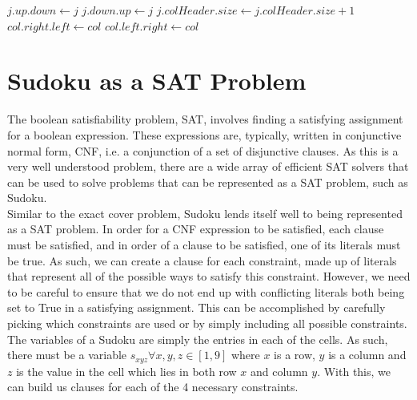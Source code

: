 \documentclass[12pt]{article}
\newcounter{row}
\newcounter{col}
\begin{document}
\begin{algorithm}[!ht]
\label{uncover}
\begin{algorithmic}
\State $j.up.down \gets j$
\State $j.down.up \gets j$
\State $j.colHeader.size \gets j.colHeader.size + 1$
\EndFor
\EndFor
\State $col.right.left \gets col$
\State $col.left.right \gets col$
\EndProcedure
\end{algorithmic}
\end{algorithm}

\section{Sudoku as a SAT Problem}
The boolean satisfiability problem, SAT, involves finding a satisfying assignment for a boolean expression. These expressions are, typically, written in conjunctive normal form, CNF, i.e. a conjunction of a set of disjunctive clauses. As this is a very well understood problem, there are a wide array of efficient SAT solvers that can be used to solve problems that can be represented as a SAT problem, such as Sudoku. \\

Similar to the exact cover problem, Sudoku lends itself well to being represented as a SAT problem. In order for a CNF expression to be satisfied, each clause must be satisfied, and in order of a clause to be satisfied, one of its literals must be true. As such, we can create a clause for each constraint, made up of literals that represent all of the possible ways to satisfy this constraint. However, we need to be careful to ensure that we do not end up with conflicting literals both being set to True in a satisfying assignment. This can be accomplished by carefully picking which constraints are used or by simply including all possible constraints. \\

The variables of a Sudoku are simply the entries in each of the cells. As such, there must be a variable $s_{xyz} \forall x,y,z \in [1,9]$ where $x$ is a row, $y$ is a column and $z$ is the value in the cell which lies in both row $x$ and column $y$. With this, we can build us clauses for each of the 4 necessary constraints. \\
\end{document}
